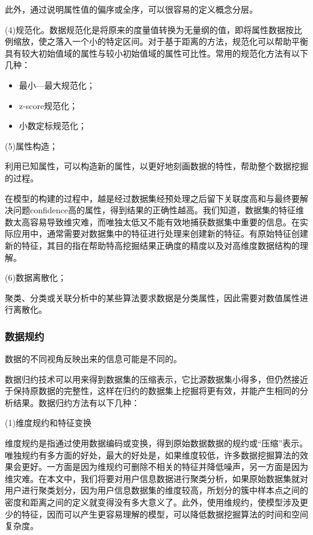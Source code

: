  此外，通过说明属性值的偏序或全序，可以很容易的定义概念分层。
 
 (4)规范化。数据规范化是将原来的度量值转换为无量纲的值，即将属性数据按比例缩放，使之落入一个小的特定区间。对于基于距离的方法，规范化可以帮助平衡具有较大初始值域的属性与较小初始值域的属性可比性。常用的规范化方法有以下几种：
 
 \begin{itemize}
 	\item 最小—最大规范化；
 		\item z-score规范化；
 			\item 小数定标规范化；
 \end{itemize}

(5)属性构造；

利用已知属性，可以构造新的属性，以更好地刻画数据的特性，帮助整个数据挖掘的过程。

在模型的构建的过程中，越是经过数据集经预处理之后留下关联度高和与最终要解决问题confidence高的属性，得到结果的正确性越高。我们知道，数据集的特征维数太高容易导致维灾难，而唯独太低又不能有效地捕获数据集中重要的信息。在实际应用中，通常需要对数据集中的特征进行处理来创建新的特征。有原始特征创建新的特征，其目的指在帮助特高挖掘结果正确度的精度以及对高维度数据结构的理解。

(6)数据离散化；

聚类、分类或关联分析中的某些算法要求数据是分类属性，因此需要对数值属性进行离散化。

\subsubsection{数据规约}

数据的不同视角反映出来的信息可能是不同的。

数据归约技术可以用来得到数据集的压缩表示，它比源数据集小得多，但仍然接近于保持原数据的完整性，这样在归约的数据集上挖掘将更有效，并能产生相同的分析结果。数据归约方法有以下几种：

(1)维度规约和特征变换

维度规约是指通过使用数据编码或变换，得到原始数据数据的规约或“压缩”表示。唯独规约有多方面的好处，最大的好处是，如果维度较低，许多数据挖掘算法的效果会更好。一方面是因为维规约可删除不相关的特征并降低噪声，另一方面是因为维灾难。在本文中，我们将要对用户信息数据进行聚类分析，如果原始数据集就对用户进行聚类划分，因为用户信息数据集的维度较高，所划分的簇中样本点之间的密度和距离之间的定义就变得没有多大意义了。此外，使用维规约，使模型涉及更少的特征，因而可以产生更容易理解的模型，可以降低数据挖掘算法的时间和空间复杂度。

